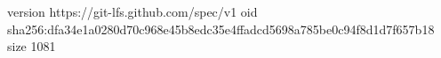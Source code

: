 version https://git-lfs.github.com/spec/v1
oid sha256:dfa34e1a0280d70c968e45b8edc35e4ffadcd5698a785be0c94f8d1d7f657b18
size 1081
